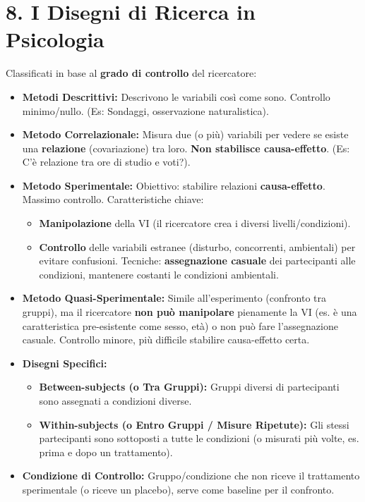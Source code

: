 \documentclass[12pt, a4paper]{article}
\begin{document}
\section*{8. I Disegni di Ricerca in Psicologia}
Classificati in base al \textbf{grado di controllo} del ricercatore:
\begin{itemize}
    \item \textbf{Metodi Descrittivi:} Descrivono le variabili così come sono. Controllo minimo/nullo. (Es: Sondaggi, osservazione naturalistica).
    \item \textbf{Metodo Correlazionale:} Misura due (o più) variabili per vedere se esiste una \textbf{relazione} (covariazione) tra loro. \textbf{Non stabilisce causa-effetto}. (Es: C'è relazione tra ore di studio e voti?).
    \item \textbf{Metodo Sperimentale:} Obiettivo: stabilire relazioni \textbf{causa-effetto}. Massimo controllo. Caratteristiche chiave:
        \begin{itemize}
            \item \textbf{Manipolazione} della VI (il ricercatore crea i diversi livelli/condizioni).
            \item \textbf{Controllo} delle variabili estranee (disturbo, concorrenti, ambientali) per evitare confusioni. Tecniche: \textbf{assegnazione casuale} dei partecipanti alle condizioni, mantenere costanti le condizioni ambientali.
        \end{itemize}
    \item \textbf{Metodo Quasi-Sperimentale:} Simile all'esperimento (confronto tra gruppi), ma il ricercatore \textbf{non può manipolare} pienamente la VI (es. è una caratteristica pre-esistente come sesso, età) o non può fare l'assegnazione casuale. Controllo minore, più difficile stabilire causa-effetto certa.
    \item \textbf{Disegni Specifici:}
        \begin{itemize}
            \item \textbf{Between-subjects (o Tra Gruppi):} Gruppi diversi di partecipanti sono assegnati a condizioni diverse.
            \item \textbf{Within-subjects (o Entro Gruppi / Misure Ripetute):} Gli stessi partecipanti sono sottoposti a tutte le condizioni (o misurati più volte, es. prima e dopo un trattamento).
        \end{itemize}
    \item \textbf{Condizione di Controllo:} Gruppo/condizione che non riceve il trattamento sperimentale (o riceve un placebo), serve come baseline per il confronto.
\end{itemize}
\end{document}
